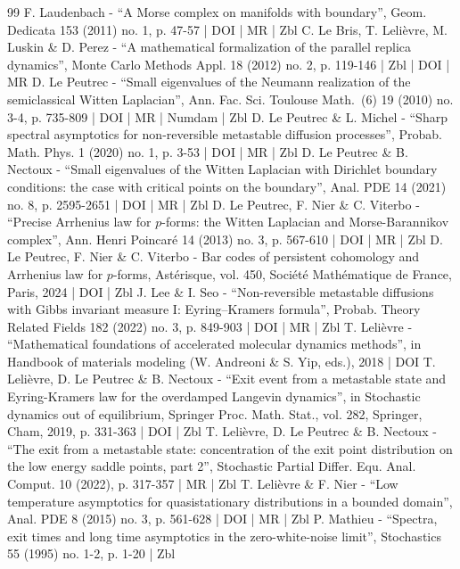 \documentclass[10pt]{amsart}
\theoremstyle{plain}
\theoremstyle{definition}
\begin{document}
\begin{thebibliography}{99}
F. Laudenbach - “A Morse complex on manifolds with boundary”, Geom. Dedicata 153 (2011) no. 1, p. 47-57 | DOI | MR | Zbl
C. Le Bris, T. Lelièvre, M. Luskin \& D. Perez - “A mathematical formalization of the parallel replica dynamics”, Monte Carlo Methods Appl. 18 (2012) no. 2, p. 119-146 | Zbl | DOI | MR
D. Le Peutrec - “Small eigenvalues of the Neumann realization of the semiclassical Witten Laplacian”, Ann. Fac. Sci. Toulouse Math. (6) 19 (2010) no. 3-4, p. 735-809 | DOI | MR | Numdam | Zbl
D. Le Peutrec \& L. Michel - “Sharp spectral asymptotics for non-reversible metastable diffusion processes”, Probab. Math. Phys. 1 (2020) no. 1, p. 3-53 | DOI | MR | Zbl
D. Le Peutrec \& B. Nectoux - “Small eigenvalues of the Witten Laplacian with Dirichlet boundary conditions: the case with critical points on the boundary”, Anal. PDE 14 (2021) no. 8, p. 2595-2651 | DOI | MR | Zbl
D. Le Peutrec, F. Nier \& C. Viterbo - “Precise Arrhenius law for $p$-forms: the Witten Laplacian and Morse-Barannikov complex”, Ann. Henri Poincaré 14 (2013) no. 3, p. 567-610 | DOI | MR | Zbl
D. Le Peutrec, F. Nier \& C. Viterbo - Bar codes of persistent cohomology and Arrhenius law for $p$-forms, Astérisque, vol. 450, Société Mathématique de France, Paris, 2024 | DOI | Zbl
J. Lee \& I. Seo - “Non-reversible metastable diffusions with Gibbs invariant measure I: Eyring–Kramers formula”, Probab. Theory Related Fields 182 (2022) no. 3, p. 849-903 | DOI | MR | Zbl
T. Lelièvre - “Mathematical foundations of accelerated molecular dynamics methods”, in Handbook of materials modeling (W. Andreoni \& S. Yip, eds.), 2018 | DOI
T. Lelièvre, D. Le Peutrec \& B. Nectoux - “Exit event from a metastable state and Eyring-Kramers law for the overdamped Langevin dynamics”, in Stochastic dynamics out of equilibrium, Springer Proc. Math. Stat., vol. 282, Springer, Cham, 2019, p. 331-363 | DOI | Zbl
T. Lelièvre, D. Le Peutrec \& B. Nectoux - “The exit from a metastable state: concentration of the exit point distribution on the low energy saddle points, part 2”, Stochastic Partial Differ. Equ. Anal. Comput. 10 (2022), p. 317-357 | MR | Zbl
T. Lelièvre \& F. Nier - “Low temperature asymptotics for quasistationary distributions in a bounded domain”, Anal. PDE 8 (2015) no. 3, p. 561-628 | DOI | MR | Zbl
P. Mathieu - “Spectra, exit times and long time asymptotics in the zero-white-noise limit”, Stochastics 55 (1995) no. 1-2, p. 1-20 | Zbl

\end{thebibliography}
\end{document}
